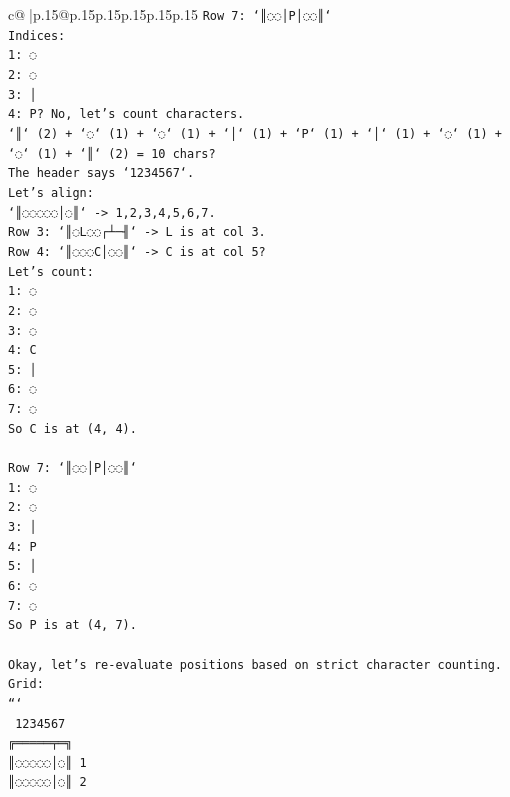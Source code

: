 \documentclass{article}
\begin{document}
{\begin{supertabular}{c@{$\;$}|p{.15\linewidth}@{}p{.15\linewidth}p{.15\linewidth}p{.15\linewidth}p{.15\linewidth}p{.15\linewidth}}
{{{\texttt{Row 7: `║◌◌│P│◌◌║`} \\
\texttt{Indices:} \\
\texttt{1: ◌} \\
\texttt{2: ◌} \\
\texttt{3: │} \\
\texttt{4: P? No, let's count characters.} \\
\texttt{`║` (2) + `◌` (1) + `◌` (1) + `│` (1) + `P` (1) + `│` (1) + `◌` (1) + `◌` (1) + `║` (2) = 10 chars?} \\
\texttt{The header says `1234567`.} \\
\texttt{Let's align:} \\
\texttt{`║◌◌◌◌◌│◌║` {-}> 1,2,3,4,5,6,7.} \\
\texttt{Row 3: `║◌L◌◌┌┴─╢` {-}> L is at col 3.} \\
\texttt{Row 4: `║◌◌◌C│◌◌║` {-}> C is at col 5?} \\
\texttt{Let's count:} \\
\texttt{1: ◌} \\
\texttt{2: ◌} \\
\texttt{3: ◌} \\
\texttt{4: C} \\
\texttt{5: │} \\
\texttt{6: ◌} \\
\texttt{7: ◌} \\
\texttt{So C is at (4, 4).} \\
\\ 
\texttt{Row 7: `║◌◌│P│◌◌║`} \\
\texttt{1: ◌} \\
\texttt{2: ◌} \\
\texttt{3: │} \\
\texttt{4: P} \\
\texttt{5: │} \\
\texttt{6: ◌} \\
\texttt{7: ◌} \\
\texttt{So P is at (4, 7).} \\
\\ 
\texttt{Okay, let's re{-}evaluate positions based on strict character counting.} \\
\texttt{Grid:} \\
\texttt{```} \\
\texttt{  1234567} \\
\texttt{╔═════╤═╗} \\
\texttt{║◌◌◌◌◌│◌║ 1} \\
\texttt{║◌◌◌◌◌│◌║ 2} \\
}}}
\end{supertabular}}
\end{document}
